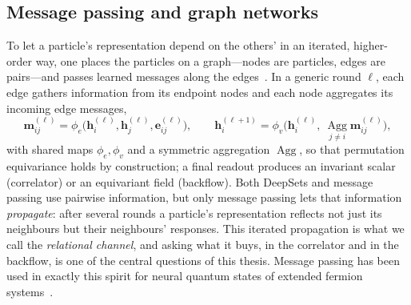 \subsection{Message passing and graph networks}
To let a particle's representation depend on the others' in an iterated, higher-order
way, one places the particles on a graph---nodes are particles, edges are
pairs---and passes learned messages along the edges~\cite{Gilmer2017-MPNN,Battaglia2018-GraphNetworks}.
In a generic round $\ell$, each edge gathers information from its endpoint nodes and each
node aggregates its incoming edge messages,
\[
  \mathbf m_{ij}^{(\ell)} = \phi_e\!\big(\mathbf h_i^{(\ell)},\mathbf h_j^{(\ell)},\mathbf e_{ij}^{(\ell)}\big),
  \qquad
  \mathbf h_i^{(\ell+1)} = \phi_v\!\Big(\mathbf h_i^{(\ell)},\ \textstyle\operatorname*{Agg}_{j\neq i}\mathbf m_{ij}^{(\ell)}\Big),
\]
with shared maps $\phi_e,\phi_v$ and a symmetric aggregation $\operatorname{Agg}$, so that
permutation equivariance holds by construction; a final readout produces an invariant
scalar (correlator) or an equivariant field (backflow). Both DeepSets and message passing
use pairwise information, but only message passing lets that information
\emph{propagate}: after several rounds a particle's representation reflects not just its
neighbours but their neighbours' responses. This iterated propagation is what we call the
\emph{relational channel}, and asking what it buys, in the correlator and in the backflow, is one of the central questions of this thesis. Message passing has been used
in exactly this spirit for neural quantum states of extended fermion
systems~\cite{Pescia2024-MessagePassingNQS,KimEtAl2023-UltracoldFermiNQS}.

